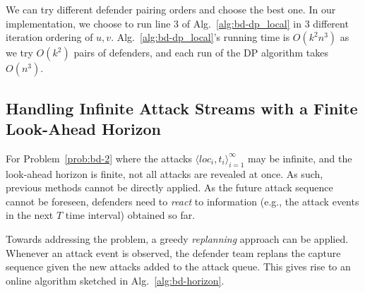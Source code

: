 We can try different defender pairing orders and choose the best one. 
In our \ours implementation, we choose to run line 3 of Alg.~\ref{alg:bd-dp_local} in 3 different iteration ordering of $u, v$.
Alg.~\ref{alg:bd-dp_local}'s running time is $O(k^2 n^3)$ as we try $O(k^2)$ pairs of defenders, and each run of the DP algorithm takes $O(n^3)$.

\subsection{Handling Infinite Attack Streams with a Finite Look-Ahead Horizon }
\label{sec:bd-hor}
For Problem~\ref{prob:bd-2} where the attacks $\big \langle loc_i, t_i\big \rangle_{i=1}^{\infty}$ may be infinite, and the look-ahead horizon is finite, not all attacks are revealed at once. As such, previous methods cannot be directly applied. 
As the future attack sequence cannot be foreseen, defenders need to \emph{react} to information (e.g., the attack events in the next $T$ time interval) obtained so far. 

Towards addressing the problem, a greedy \emph{replanning} approach can be applied. Whenever an attack event is observed, the defender team replans the capture sequence given the new attacks added to the attack queue. 
This gives rise to an online algorithm sketched in Alg.~\ref{alg:bd-horizon}.

